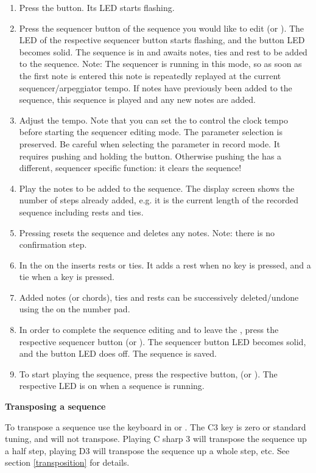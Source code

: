 \begin{enumerate}
  \item Press the \record button. Its LED starts flashing.
  \item Press the sequencer button of the sequence you would like to edit (\seqone or \seqtwo). The LED of the respective sequencer button starts flashing, and the \record button LED becomes solid. The sequence is in \seqedit and awaits notes, ties and rest to be added to the sequence. Note: The sequencer is running in this mode, so as soon as the first note is entered this note is repeatedly replayed at the current sequencer/arpeggiator tempo. If notes have previously been added to the sequence, this sequence is played and any new notes are added. 
  \item Adjust the tempo. Note that you can set the \datadial to control the clock tempo before starting the sequencer editing mode. The parameter selection is preserved. Be careful when selecting the parameter in record mode. It requires pushing and holding  the \totape button. Otherwise pushing the  has a different, sequencer specific function: it clears the sequence!  
  \item Play the notes to be added to the sequence. The display screen shows the number of steps already added, e.g. it is the current length of the recorded sequence including rests and ties.
  \item Pressing  resets the sequence and deletes any notes. Note: there is no confirmation step. 
  \item In \seqedit the  on the \termnumberpad inserts rests or ties. It adds a rest when no key is pressed, and a tie when a key is pressed.
  \item Added notes (or chords), ties and rests can be successively deleted/undone using the  on the number pad. 
  \item In order to complete the sequence editing and to leave the \seqedit, press the respective sequencer button (\seqone or \seqtwo). The sequencer button LED becomes solid, and the \record button LED does off. The sequence is saved. 
  \item To start playing the sequence, press the respective button, (\seqone or \seqtwo). The respective LED is on when a sequence is running.
\end{enumerate}

\textbf{Transposing a  sequence}

To transpose a sequence use the keyboard in \shiftmode or \shiftlock. The C3 key is zero or standard tuning, and will not transpose. Playing C sharp 3 will transpose the sequence up a half step, playing D3 will transpose the sequence up a whole step, etc. See section \ref{transposition} for details.
